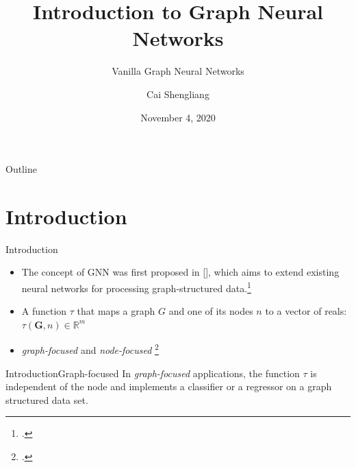 \documentclass[10pt,aspectratio=169]{beamer}
\title{Introduction to Graph Neural Networks}
\subtitle{Vanilla Graph Neural Networks}
\author{Cai Shengliang}
\institute{Multi-Agent Artificial Intelligence Laboratory}
\date{November 4, 2020}
\begin{document}
\begin{frame}
    \titlepage
\end{frame}

\begin{frame}{Outline}
    \tableofcontents   
\end{frame}

\section{Introduction}
\begin{frame}{Introduction}
    \begin{itemize}[<+->]
        \item The concept of GNN was first proposed in \citeauthor{Scarselli2009} [\citeyear{Scarselli2009}], which aims to extend existing neural networks for processing graph-structured data.\footcite{liu2020introduction}
        \item A function $\tau$ that maps a graph $G$ and one of its nodes $n$  to a vector of reals: $\tau(\boldsymbol{G}, n) \in \mathbb{R} ^ m$
        \item \emph{graph-focused} and \emph{node-focused} \footcite{Scarselli2009}
    \end{itemize}
\end{frame}

\begin{frame}{Introduction}{Graph-focused}
    In \emph{graph-focused} applications, the function $\tau$ is independent of the node and implements a classifier or a regressor on a graph structured data set.

    \begin{figure}
        \centering
    \end{figure}
\end{frame}
\end{document}
